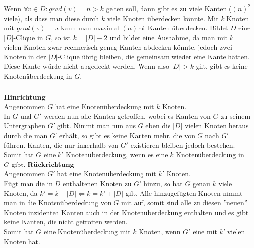 \documentclass[a4paper]{article}
\begin{document}
		\subsubsection{}
			Wenn $\forall v\in D: grad(v)=n>k$ gelten soll, dann gibt es zu viele Kanten ($(n)^2$ viele), als dass man diese durch $k$ viele Knoten überdecken könnte.
			Mit $k$ Knoten mit $grad(v)=n$ kann man maximal $(n)\cdot k$ Kanten überdecken.\n
			Bildet $D$ eine $|D|$-Clique in $G$, so ist $k=|D|-2$ und bildet eine Ausnahme, da man mit $k$ vielen Knoten zwar rechnerisch genug Kanten abdecken könnte, jedoch zwei Knoten in der $|D|$-Clique übrig bleiben, die gemeinsam wieder eine Kante hätten.
			Diese Kante würde nicht abgedeckt werden.\n
			Wenn also $|D|>k$ gilt, gibt es keine Knotenüberdeckung in $G$.
		\subsubsection{}
			\textbf{Hinrichtung}\\
			Angenommen $G$ hat eine Knotenüberdeckung mit $k$ Knoten.\\
			In $G$ und $G'$ werden nun alle Kanten getroffen, wobei es Kanten von $G$ zu seinem Untergraphen $G'$ gibt. Nimmt man nun aus $G$ eben die $|D|$ vielen Knoten heraus durch die man $G'$ erhält, so gibt es keine Kanten mehr, die von $G$ nach $G'$ führen. Kanten, die nur innerhalb von $G'$ existieren bleiben jedoch bestehen.\\
			Somit hat $G$ eine $k'$ Knotenüberdeckung, wenn es eine $k$ Knotenüberdeckung in $G$ gibt.\n
			\textbf{Rückrichtung}\\
			Angenommen $G'$ hat eine Knotenüberdeckung mit $k'$ Knoten.\\
			Fügt man die in $D$ enthaltenen Knoten zu $G'$ hinzu, so hat $G$ genau $k$ viele Knoten, da $k'=k-|D| \Leftrightarrow k=k'+|D|$ gilt.
			Alle hinzugefügten Knoten nimmt man in die Knotenüberdeckung von $G$ mit auf, somit sind alle zu diesen ''neuen'' Knoten inzidenten Kanten auch in der Knotenüberdeckung enthalten und es gibt keine Kanten, die nicht getroffen werden.\\
			Somit hat $G$ eine Knotenüberdeckung mit $k$ Knoten, wenn $G'$ eine mit $k'$ vielen Knoten hat.
\end{document}
